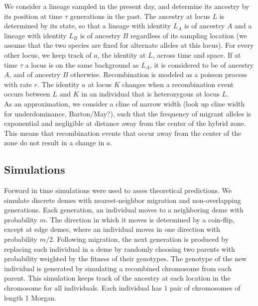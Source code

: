 \documentclass[12pt]{amsart}
\begin{document}
We consider a lineage sampled in the present day, and determine its ancestry by its position at time $\tau$ generations in the past. The ancestry at locus $L$ is determined by its state, so that a lineage with identity $L_A$ is of ancestry $A$ and a lineage with identity $L_B$ is of ancestry $B$ regardless of its sampling location (we assume that the two species are fixed for alternate alleles at this locus). For every other locus, we keep track of $a$, the identity at $L$, across time and space. If at time $\tau$ a locus is on the same background as $L_A$, it is considered to be of ancestry $A$, and of ancestry $B$ otherwise. Recombination is modeled as a poisson process with rate $r$. The identity $a$ at locus $K$ changes when a recombination event occurs between $L$ and $K$ in an individual that is heterozygous at locus $L$. 
\\

As an approximation, we consider a cline of narrow width (look up cline width for underdominance, Barton/May?), such that the frequency of migrant alleles is exponential and negligible at distance away from the center of the hybrid zone. This means that recombination events that occur away from the center of the zone do not result in a change in $a$.\\


\subsection{}

\subsection{Simulations}
Forward in time simulations were used to asses theoretical predictions. We simulate discrete demes with nearest-neighbor migration and non-overlapping generations. Each generation, an individual moves to a neighboring deme with probability $m$. The direction in which it moves is determined by a coin-flip, except at edge demes, where an individual moves in one direction with probability $m/2$. Following migration, the next generation is produced by replacing each individual in a deme by randomly choosing two parents with probability weighted by the fitness of their genotypes. The genotype of the new individual is generated by simulating a recombined chromosome from each parent. This simulation keeps track of the ancestry at each location in the chromosome for all individuals. Each individual has 1 pair of chromosomes of length 1 Morgan. 
\end{document}
